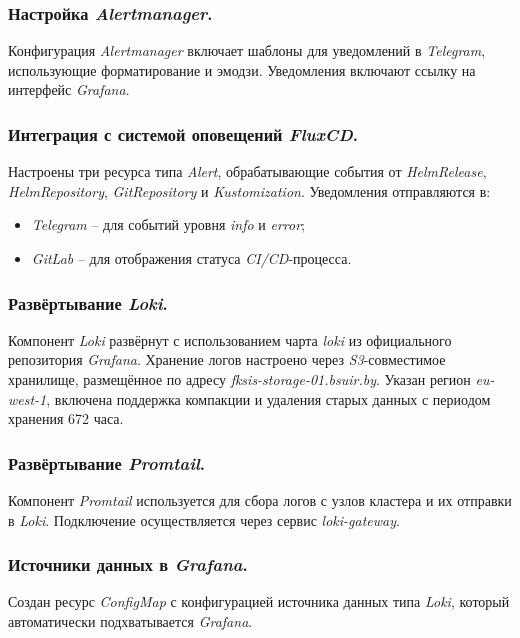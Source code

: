 \subsubsection{Настройка \textit{Alertmanager}.} Конфигурация \textit{Alertmanager} включает шаблоны для уведомлений в \textit{Telegram}, использующие форматирование и эмодзи. Уведомления включают ссылку на интерфейс \textit{Grafana}.

\subsubsection{Интеграция с системой оповещений \textit{FluxCD}.} Настроены три ресурса типа \textit{Alert}, обрабатывающие события от \textit{HelmRelease}, \textit{HelmRepository}, \textit{GitRepository} и \textit{Kustomization}. Уведомления отправляются в:

\begin{itemize}
    \item \textit{Telegram} -- для событий уровня \textit{info} и \textit{error};
    \item \textit{GitLab} -- для отображения статуса \textit{CI/CD}-процесса.
\end{itemize}

\subsubsection{Развёртывание \textit{Loki}.} Компонент \textit{Loki} развёрнут с использованием чарта \textit{loki} из официального репозитория \textit{Grafana}. Хранение логов настроено через \textit{S3}-совместимое хранилище, размещённое по адресу \textit{fksis-storage-01.bsuir.by}. Указан регион \textit{eu-west-1}, включена поддержка компакции и удаления старых данных с периодом хранения 672 часа.

\subsubsection{Развёртывание \textit{Promtail}.} Компонент \textit{Promtail} используется для сбора логов с узлов кластера и их отправки в \textit{Loki}. Подключение осуществляется через сервис \textit{loki-gateway}.

\subsubsection{Источники данных в \textit{Grafana}.} Создан ресурс \textit{ConfigMap} с конфигурацией источника данных типа \textit{Loki}, который автоматически подхватывается \textit{Grafana}.

